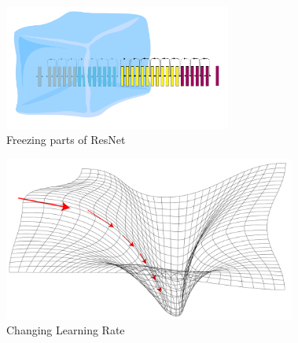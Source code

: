 \documentclass{beamer}
\begin{document}
\begin{frame}
\begin{columns}
\begin{column}{0.5\textwidth}
\begin{itemize}
\end{itemize}
\end{column}
\begin{column}{0.5\textwidth}  %
\begin{center}
\begin{itemize}
    \begin{figure}
        \includegraphics[width=0.7\textwidth]{figures/freeze.pdf}
    \caption{Freezing parts of ResNet}
    \end{figure}
    \begin{figure}
        \includegraphics[width=0.9\textwidth]{figures/learningrate.pdf}
    \caption{Changing Learning Rate }
    \end{figure}   
\end{itemize}
\end{center}
\end{column}
\end{columns}
\end{frame}



\end{document}
